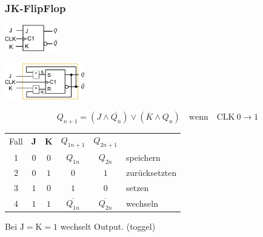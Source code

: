 \subsubsection{JK-FlipFlop}
\begin{center}
    \begin{minipage}[c]{0.4\linewidth}
        \includegraphics[width = 23mm]{images/jk_ff.jpeg}
    \end{minipage}
    \hfill
    \begin{minipage}[c]{0.55\linewidth}
        \includegraphics[width = 35mm]{images/jk_ff_cir.jpeg}
    \end{minipage}
\end{center}
\begin{equation*}
    Q_{n + 1} = \left(J \land \overline{Q_n}\right) \lor \left(\overline{K} \land Q_n\right) \quad \text{wenn} \quad \text{CLK}~0\rightarrow 1 
\end{equation*}
\begin{center}
    \begin{tabular}{c|c c|c c l}
        Fall & \textbf{J} & \textbf{K} & $Q_{1n + 1}$ & $Q_{2n + 1}$ & \\
        \cline{1-5}
        1 & $0$ & $0$ & $Q_{1n}$ & $Q_{2n}$ & speichern\\        
        2 & $0$ & $1$ & $0$ & $1$ & zurücksetzten\\        
        3 & $1$ & $0$ & $1$ & $0$ & setzen\\        
        4 & $1$ & $1$ & $\overline{Q_{1n}}$ & $\overline{Q_{2n}}$ & wechseln\\        
    \end{tabular}
\end{center}
Bei $\text{J}=\text{K}=1$ wechselt Output. (toggel)
